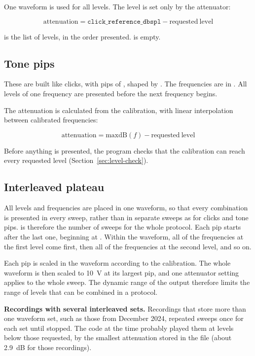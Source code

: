 One waveform is used for all levels. The level is set only by the attenuator:

\[
\mathrm{attenuation} = \texttt{click\_reference\_dbspl} - \mathrm{requested\ level}
\]

 is the list of levels, in the order presented.  is empty.

\subsection{Tone pips}

These are built like clicks, with  pips of , shaped by
. The frequencies are in . All levels of one
frequency are presented before the next frequency begins.

The attenuation is calculated from the calibration, with linear interpolation between
calibrated frequencies:

\[
\mathrm{attenuation} = \mathrm{maxdB}(f) - \mathrm{requested\ level}
\]

Before anything is presented, the program checks that the calibration can reach every
requested level (Section~\ref{sec:level-check}).

\subsection{Interleaved plateau}
\label{sec:interleaved}

All levels and frequencies are placed in one waveform, so that every combination is
presented in every sweep, rather than in separate sweeps as for clicks and tone pips.
 is therefore the number of sweeps for the whole protocol. Each pip starts  after the last one,
beginning at . Within the waveform, all of the frequencies at the first level
come first, then all of the frequencies at the second level, and so on.

Each pip is scaled in the waveform according to the calibration. The whole waveform is
then scaled to 10~V at its largest pip, and one attenuator setting applies to the whole
sweep. The dynamic range of the output therefore limits the range of levels that can be
combined in a protocol.

\begin{caution}
\textbf{Recordings with several interleaved sets.} Recordings that store more than one
waveform set, such as those from December 2024, repeated  sweeps once for each
set until stopped. The code at the time probably played them at levels below those
requested, by the smallest attenuation stored in the file (about 2.9~dB for those
recordings).
\end{caution}

